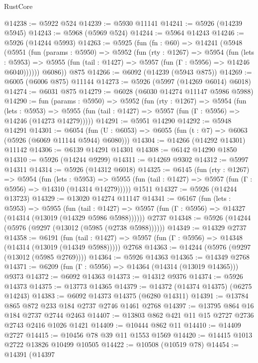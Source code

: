 \begin{lexlean}{RustCore}
\begin{coremodule}
@14238 := @5922 @524
@14239 := @5930 @11141
@14241 := @5926 (@14239 @5945)
@14243 := @5968 (@5969 @524)
@14244 := @5964 @14243
@14246 := @5926 (@14244 @5993)
@14263 := @5925
    (fun (fn : @60) =>
    @14241
      (@5948
        (@5951
          (fun (params : @5950) =>
          @5952
            (fun (rty : @1267) =>
            @5954
              (fun (lets : @5953) =>
              @5955 (fun (tail : @1427) => @5957 (fun (Γ : @5956) => @14246 @6040))))))
        @6086))
    @875
@14266 := @6092 (@14239 (@5943 @875))
@14269 := @6005 (@6006 @875) @11144
@14273 := @5926 (@5997 (@14269 @6014) @6018)
@14274 := @6031 @875
@14279 := @6028 (@6030 @14274 @11147 @5986 @5988)
@14290 := fun (params : @5950) =>
  @5952
    (fun (rty : @1267) =>
    @5954
      (fun (lets : @5953) =>
      @5955 (fun (tail : @1427) => @5957 (fun (Γ : @5956) => @14246 (@14273 @14279)))))
@14291 := @5951 @14290
@14292 := @5948 @14291
@14301 := @6054
    (fun (U : @6053) => @6055 (fun (t : @7) => @6063 (@5926 (@6069 @11144 @5944) @6080)))
@14304 := @14266 (@14292 @14301) @11142
@14306 := @6139 @14291 @14301
@14308 := @6142 @14290 @1850
@14310 := @5926 (@14244 @9299)
@14311 := @14269 @9302
@14312 := @5997 @14311
@14314 := @5926 (@14312 @6018)
@14325 := @6145
    (fun (rty : @1267) =>
    @5954
      (fun (lets : @5953) =>
      @5955 (fun (tail : @1427) => @5957 (fun (Γ : @5956) => @14310 (@14314 @14279)))))
    @1511
@14327 := @5926 (@14244 @13723)
@14329 := @13020 @14274 @11147
@14341 := @6167
    (fun (lets : @5953) =>
    @5955
      (fun (tail : @1427) =>
      @5957 (fun (Γ : @5956) => @14327 (@14314 (@13019 (@14329 @5986 @5988))))))
    @2737
@14348 := @5926 (@14244 (@5976 (@9297 (@13012 (@5985 (@2738 @5988))))))
@14349 := @14329 @2737
@14358 := @6191
    (fun (tail : @1427) => @5957 (fun (Γ : @5956) => @14348 (@14314 (@13019 (@14349 @5988)))))
    @2768
@14363 := @14244 (@5976 (@9297 (@13012 (@5985 @2769))))
@14364 := @5926 @14363
@14365 := @14349 @2768
@14371 := @6209 (fun (Γ : @5956) => @14364 (@14314 (@13019 @14365))) @9373
@14372 := @6092 @14363
@14373 := @14312 @9376
@14374 := @5926 @14373
@14375 := @13773 @14365
@14379 := @14372 (@14374 @14375) (@6275 @14243)
@14383 := @6092 @14373 @14375 (@6280 @14311)
@14391 := @13784 @865 @872 @233 @184 @2737 @2746 @1461 @2768
@14397 := @13795 @864 @16 @184 @2737 @2744 @2463
@14407 := @13803 @862 @421 @11 @15 @2727 @2736 @2743 @2416 @1026 @1421
@14409 := @10444 @862 @11
@14410 := @14409 @2727
@14415 := @10456 @78 @39 @11 @1553 @1569
@14420 := @14415 @1013 @2722 @13826 @10499 @10505
@14422 := @10508 (@10519 @78)
@14454 := @14391
    (@14397

\end{coremodule}
\end{lexlean}
